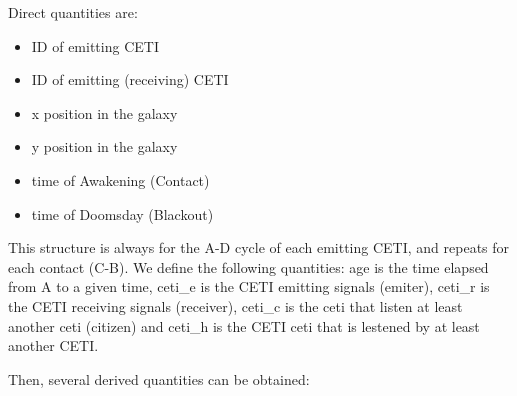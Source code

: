 \documentclass[useAMS,usenatbib]{mnras}
\begin{document}
Direct quantities are:

\begin{itemize}
   \item ID of emitting CETI
   \item ID of emitting (receiving) CETI 
   \item x position in the galaxy
   \item y position in the galaxy
   \item time of Awakening (Contact)
   \item time of Doomsday  (Blackout)
\end{itemize}

This structure is always for the A-D cycle of each emitting CETI,
and repeats for each contact (C-B).
%
We define the following quantities: age is the time elapsed from A to a
given time, ceti\_e is the CETI emitting signals (emiter), ceti\_r is
the CETI receiving signals (receiver), ceti\_c is the ceti that listen
at least another ceti (citizen) and ceti\_h is the CETI ceti that is
lestened by at least another CETI.

Then, several derived quantities can be obtained:
\end{document}
